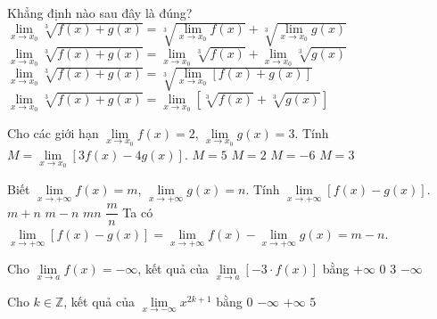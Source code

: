 \begin{ex}%
	Khẳng định nào sau đây là đúng?
	\choice
	{$\lim\limits_{x\to x_0} \sqrt[3]{f(x)+g(x)} =\sqrt[3]{\lim\limits_{x \to x_0} f(x)}+\sqrt[3]{\lim\limits_{x \to x_0} g(x)}$}
	{$\lim\limits_{x\to x_0} \sqrt[3]{f(x)+g(x)} =\lim\limits_{x \to x_0}\sqrt[3]{f(x)}+\lim\limits_{x \to x_0}\sqrt[3]{g(x)}$}
	{\True $\lim\limits_{x\to x_0} \sqrt[3]{f(x)+g(x)} =\sqrt[3]{\lim\limits_{x \to x_0} [f(x)+g(x)]}$}
	{$\lim\limits_{x\to x_0} \sqrt[3]{f(x)+g(x)} =\lim\limits_{x \to x_0}\left[\sqrt[3]{f(x)}+\sqrt[3]{g(x)}\right]$}
\end{ex}


\begin{ex}%
	Cho các giới hạn $\lim \limits_{x\rightarrow x_0}f(x)=2$, $\lim \limits_{x\rightarrow x_0}g(x)=3$. Tính $M=\lim \limits_{x\rightarrow x_0}[3f(x)-4g(x)]$.
	\choice
	{$M=5$}
	{$M=2$}
	{\True $M=-6$}
	{$M=3$}
\end{ex}


\begin{ex}%
	Biết $\lim\limits_{x \to +\infty}f(x)=m$, $\lim\limits_{x \to +\infty}g(x)=n$. Tính $\lim\limits_{x \to +\infty}\left[f(x)-g(x)\right]$.
	\choice
	{ $m+n$}
	{\True $m-n$}
	{$mn$}
	{$\dfrac{m}{n}$}
	\loigiai
	{
		Ta có $\lim\limits_{x \to +\infty}\left[f(x)-g(x)\right] = \lim\limits_{x \to +\infty}f(x) - \lim\limits_{x \to +\infty}g(x) = m-n$.
	}
\end{ex}


\begin{ex}%
	Cho $\lim\limits_{x \to a} f(x)=-\infty$, kết quả của $\lim\limits_{x \to a} [-3\cdot f(x)]$ bằng
	\choice
	{\True $+ \infty$}
	{$0$}
	{$3$}
	{$-\infty$}
\end{ex}


\begin{ex}%
	Cho $k\in \mathbb{Z}$, kết quả của $\lim\limits_{x \to -\infty} x^{2k+1}$ bằng
	\choice
	{$0$}
	{\True $-\infty$}
	{$+\infty$}
	{$5$}
\end{ex}


